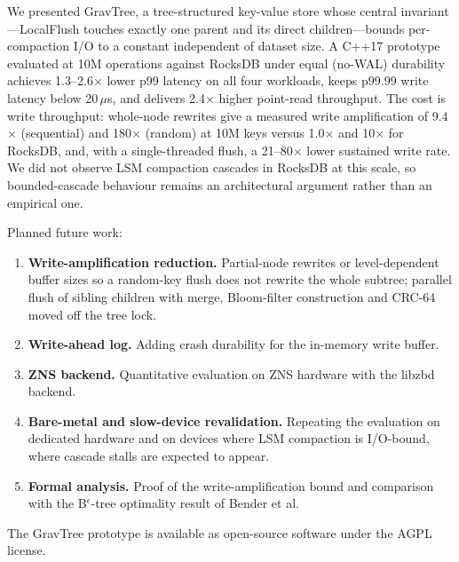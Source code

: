 \documentclass[10pt,twocolumn]{article}
\begin{document}
We presented GravTree, a tree-structured key-value store whose central
invariant---LocalFlush touches exactly one parent and its direct
children---bounds per-compaction I/O to a constant independent of dataset
size.  A C++17 prototype evaluated at 10M operations against RocksDB under
equal (no-WAL) durability achieves 1.3--2.6$\times$ lower p99 latency on all
four workloads, keeps p99.99 write latency below 20\,$\mu$s, and delivers
2.4$\times$ higher point-read throughput.  The cost is write throughput:
whole-node rewrites give a measured write amplification of 9.4$\times$
(sequential) and 180$\times$ (random) at 10M keys versus 1.0$\times$ and
10$\times$ for RocksDB, and, with a single-threaded flush, a 21--80$\times$
lower sustained write rate.  We did not observe LSM
compaction cascades in RocksDB at this scale, so bounded-cascade behaviour
remains an architectural argument rather than an empirical one.

Planned future work:

\begin{enumerate}[leftmargin=1.5em]
  \item \textbf{Write-amplification reduction.} Partial-node rewrites or
        level-dependent buffer sizes so a random-key flush does not rewrite
        the whole subtree; parallel flush of sibling children with merge,
        Bloom-filter construction and CRC-64 moved off the tree lock.
  \item \textbf{Write-ahead log.} Adding crash durability for the in-memory
        write buffer.
  \item \textbf{ZNS backend.} Quantitative evaluation on ZNS hardware with
        the libzbd backend.
  \item \textbf{Bare-metal and slow-device revalidation.} Repeating the
        evaluation on dedicated hardware and on devices where LSM compaction
        is I/O-bound, where cascade stalls are expected to appear.
  \item \textbf{Formal analysis.} Proof of the write-amplification bound
        and comparison with the B$^\epsilon$-tree optimality result of
        Bender et al.
\end{enumerate}

The GravTree prototype is available as open-source software under the AGPL
license.

\balance


\end{document}

